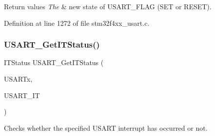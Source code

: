 \begin{DoxyRetVals}{Return values}
{\em The} & new state of U\+S\+A\+R\+T\+\_\+\+F\+L\+AG (S\+ET or R\+E\+S\+ET). \\
\hline
\end{DoxyRetVals}


Definition at line 1272 of file stm32f4xx\+\_\+usart.\+c.

\mbox{\label{group___u_s_a_r_t_ga93d8f031241bcdbe938d091a85295445}} 
\subsubsection{\texorpdfstring{U\+S\+A\+R\+T\+\_\+\+Get\+I\+T\+Status()}{USART\_GetITStatus()}}
{\footnotesize\ttfamily I\+T\+Status U\+S\+A\+R\+T\+\_\+\+Get\+I\+T\+Status (\begin{DoxyParamCaption}\item[{\hyperlink{struct_u_s_a_r_t___type_def}{U\+S\+A\+R\+T\+\_\+\+Type\+Def} $\ast$}]{U\+S\+A\+R\+Tx,  }\item[{uint16\+\_\+t}]{U\+S\+A\+R\+T\+\_\+\+IT }\end{DoxyParamCaption})}



Checks whether the specified U\+S\+A\+RT interrupt has occurred or not. 


